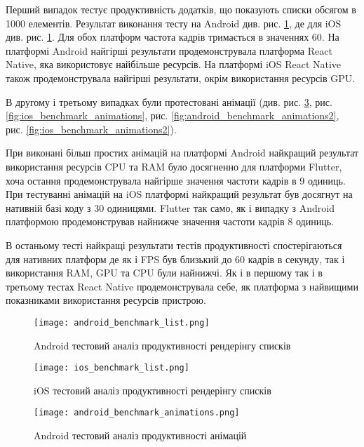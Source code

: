 Перший випадок тестує продуктивність додатків, що показують списки обсягом в 1000 елементів.
Результат виконання тесту на Android див. рис. \ref{fig:android_benchmark_list}, де
для iOS див. рис. \ref{fig:android_benchmark_list}.
Для обох платформ частота кадрів тримається в значеннях 60.
На платформі Android найгірші результати продемонструвала платформа React Native, яка використовує найбільше ресурсів.
На платформі iOS React Native також продемонструвала найгірші результати, окрім використання ресурсів GPU.

В другому і третьому випадках були протестовані анімації (див. рис.
\ref{fig:android_benchmark_animations}, рис. \ref{fig:ios_benchmark_animations},
рис. \ref{fig:android_benchmark_animations2}, рис. \ref{fig:ios_benchmark_animations2}).

При виконані більш простих анімацій на платформі Android найкращий результат використання ресурсів CPU та RAM було
досягненно для платформи Flutter, хоча остання продемонструвала найгірше значення частоти кадрів в 9 одиниць.
При тестуванні анімацій на iOS платформі найкращий результат був досягнут на нативній базі коду з 30 одиницями.
Flutter так само, як і випадку з Android платформою продемонстрував найнижче значення частоти кадрів 8 одиниць.

В останьому тесті найкращі результати тестів продуктивності спостерігаються для нативних платформ де як і FPS був близький до 60 кадрів в секунду,
так і використання RAM, GPU та CPU були найнижчі. Як і в першому так і в третьому тестах React Native продемонструвала
себе, як платформа з найвищими показниками використання ресурсів пристрою.

\begin{figure}
    \texttt{[image: android\_benchmark\_list.png]}
    \caption{Android тестовий аналіз продуктивності рендерінгу списків}
    \label{fig:android_benchmark_list}
\end{figure}

\begin{figure}
    \texttt{[image: ios\_benchmark\_list.png]}
    \caption{iOS тестовий аналіз продуктивності рендерінгу списків}
    \label{fig:ios_benchmark_list}
\end{figure}

\begin{figure}
    \texttt{[image: android\_benchmark\_animations.png]}
    \caption{Android тестовий аналіз продуктивності анімацій}
    \label{fig:android_benchmark_animations}
\end{figure}

